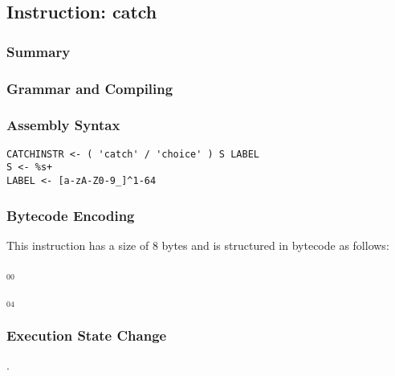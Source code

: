 \subsection{Instruction: catch}

\subsubsection{Summary}


\subsubsection{Grammar and Compiling}


\subsubsection{Assembly Syntax}

\begin{myquote}
\begin{verbatim}
CATCHINSTR <- ( 'catch' / 'choice' ) S LABEL
S <- %s+
LABEL <- [a-zA-Z0-9_]^1-64
\end{verbatim}
\end{myquote}


\subsubsection{Bytecode Encoding}

This instruction has a size of 8 bytes and is structured in bytecode as follows:

$_{00}$\ 



$_{04}$\ 


\subsubsection{Execution State Change}

.


